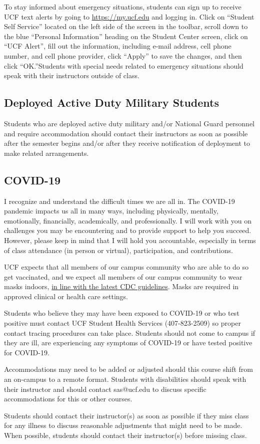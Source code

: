 \documentclass[11pt]{article}
\begin{document}
To stay informed about emergency situations, students can sign up to receive UCF
text alerts by going to \url{https://my.ucf.edu} and logging in. Click on “Student
Self Service” located on the left side of the screen in the toolbar, scroll down
to the blue “Personal Information” heading on the Student Center screen, click
on “UCF Alert”, fill out the information, including e-mail address, cell phone
number, and cell phone provider, click “Apply” to save the changes, and then
click “OK.”Students with special needs related to emergency situations should
speak with their instructors outside of class.

\subsection*{Deployed Active Duty Military Students}

Students who are deployed active duty military and/or National Guard personnel
and require accommodation should contact their instructors as soon as possible
after the semester begins and/or after they receive notification of deployment
to make related arrangements.

\subsection*{COVID-19}

I recognize and understand the difficult times we are all in. The COVID-19
pandemic impacts us all in many ways, including physically, mentally,
emotionally, financially, academically, and professionally. I will work with you
on challenges you may be encountering and to provide support to help you
succeed. However, please keep in mind that I will hold you accountable,
especially in terms of class attendance (in person or virtual), participation,
and contributions.

UCF expects that all members of our campus community who are able to do so get
vaccinated, and we expect all members of our campus community to wear masks
indoors,
\href{https://www.cdc.gov/coronavirus/2019-ncov/vaccines/fully-vaccinated.html}{in
line with the latest CDC guidelines}. Masks are required in approved clinical or
health care settings.

Students who believe they may have been exposed to COVID-19 or who test positive
must contact UCF Student Health Services (407-823-2509) so proper contact
tracing procedures can take place. Students should not come to campus if they
are ill, are experiencing any symptoms of COVID-19 or have tested positive for
COVID-19.

Accommodations may need to be added or adjusted should this course shift from an
on-campus to a remote format. Students with disabilities should speak with their
instructor and should contact sas@ucf.edu to discuss specific accommodations for
this or other courses.

Students should contact their instructor(s) as soon as possible if they miss
class for any illness to discuss reasonable adjustments that might need to be
made. When possible, students should contact their instructor(s) before missing
class.


\end{document}
